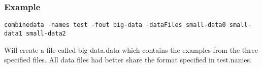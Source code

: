 \subsubsection*{Example}

{\tt combinedata -names test -fout big-data -data\-Files small-data0 small-data1 small-data2}

Will create a file called big-data.data which contains the examples from the three specified files. All data files had better share the format specified in test.names.

